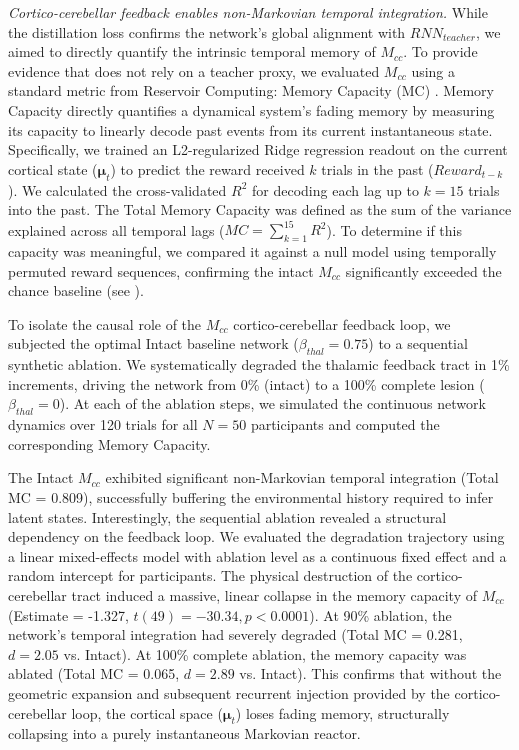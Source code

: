 \documentclass[12pt, a4paper]{extarticle}
\begin{document}
\textit{Cortico-cerebellar feedback enables non-Markovian temporal integration.}
While the distillation loss confirms the network's global alignment with $RNN_{teacher}$, we aimed to directly quantify the intrinsic temporal memory of $M_{cc}$. To provide evidence that does not rely on a teacher proxy, we evaluated $M_{cc}$ using a standard metric from Reservoir Computing: Memory Capacity (MC) \parencite{jaeger2002}. Memory Capacity directly quantifies a dynamical system's fading memory by measuring its capacity to linearly decode past events from its current instantaneous state. Specifically, we trained an L2-regularized Ridge regression readout on the current cortical state ($\boldsymbol{\mu}_t$) to predict the reward received $k$ trials in the past ($Reward_{t-k}$). We calculated the cross-validated $R^2$ for decoding each lag up to $k=15$ trials into the past. The Total Memory Capacity was defined as the sum of the variance explained across all temporal lags ($MC = \sum_{k=1}^{15} R^2$). To determine if this capacity was meaningful, we compared it against a null model using temporally permuted reward sequences, confirming the intact $M_{cc}$ significantly exceeded the chance baseline (see ).

To isolate the causal role of the $M_{cc}$ cortico-cerebellar feedback loop, we subjected the optimal Intact baseline network ($\beta_{thal} = 0.75$) to a sequential synthetic ablation. We systematically degraded the thalamic feedback tract in 1\% increments, driving the network from 0\% (intact) to a 100\% complete lesion ($\beta_{thal} = 0$). At each of the ablation steps, we simulated the continuous network dynamics over 120 trials for all $N=50$ participants and computed the corresponding Memory Capacity.

The Intact $M_{cc}$ exhibited significant non-Markovian temporal integration (Total MC = 0.809), successfully buffering the environmental history required to infer latent states. Interestingly, the sequential ablation revealed a structural dependency on the feedback loop. We evaluated the degradation trajectory using a linear mixed-effects model with ablation level as a continuous fixed effect and a random intercept for participants. The physical destruction of the cortico-cerebellar tract induced a massive, linear collapse in the memory capacity of $M_{cc}$ (Estimate = -1.327, $t(49) = -30.34, p < 0.0001$). At 90\% ablation, the network's temporal integration had severely degraded (Total MC = 0.281, $d = 2.05$ vs. Intact). At 100\% complete ablation, the memory capacity was ablated (Total MC = 0.065, $d = 2.89$ vs. Intact). This confirms that without the geometric expansion and subsequent recurrent injection provided by the cortico-cerebellar loop, the cortical space ($\boldsymbol{\mu}_t$) loses fading memory, structurally collapsing into a purely instantaneous Markovian reactor.
\end{document}
